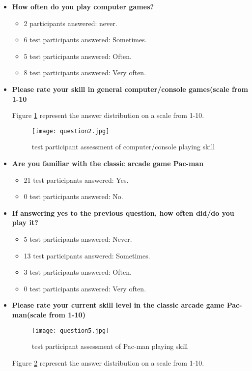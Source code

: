 \begin{itemize}
\item \textbf{How often do you play computer games?}
\begin{itemize}
\item 2 participants answered: never.
\item 6 test participants answered: Sometimes.
\item 5 test participants answered: Often.
\item 8 test participants answered: Very often.
\end{itemize}
\item \textbf{Please rate your skill in general computer/console games(scale from 1-10}

Figure \ref{fig:question2} represent the answer distribution on a scale from 1-10.

\begin{figure}[!htbp]
\centering
\texttt{[image: question2.jpg]}
\caption{test participant assessment of computer/console playing skill}
\label{fig:question2}
\end{figure}

\item \textbf{Are you familiar with the classic arcade game Pac-man}
\begin{itemize}
\item 21 test participants answered: Yes.
\item 0 test participants answered: No.
\end{itemize}
\item \textbf{If answering yes to the previous question, how often did/do you play it?}
\begin{itemize}
\item 5 test participants answered: Never.
\item 13 test participants answered: Sometimes.
\item 3 test participants answered: Often.
\item 0 test participants answered: Very often.
\end{itemize}
\item \textbf{Please rate your current skill level in the classic arcade game Pac-man(scale from 1-10)}

\begin{figure}[!htbp]
\centering
\texttt{[image: question5.jpg]}
\caption{test participant assessment of Pac-man playing skill}
\label{fig:question5}
\end{figure}

Figure \ref{fig:question5} represent the answer distribution on a scale from 1-10.
\end{itemize} 


